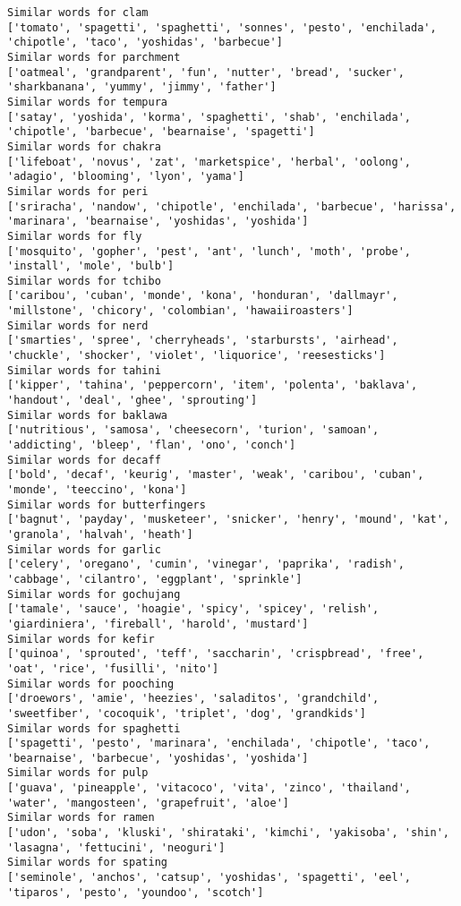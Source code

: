 \documentclass[11pt]{article}
\begin{document}
\begin{Verbatim}[commandchars=\\\{\}]
Similar words for clam
['tomato', 'spagetti', 'spaghetti', 'sonnes', 'pesto', 'enchilada', 'chipotle', 'taco', 'yoshidas', 'barbecue']
Similar words for parchment
['oatmeal', 'grandparent', 'fun', 'nutter', 'bread', 'sucker', 'sharkbanana', 'yummy', 'jimmy', 'father']
Similar words for tempura
['satay', 'yoshida', 'korma', 'spaghetti', 'shab', 'enchilada', 'chipotle', 'barbecue', 'bearnaise', 'spagetti']
Similar words for chakra
['lifeboat', 'novus', 'zat', 'marketspice', 'herbal', 'oolong', 'adagio', 'blooming', 'lyon', 'yama']
Similar words for peri
['sriracha', 'nandow', 'chipotle', 'enchilada', 'barbecue', 'harissa', 'marinara', 'bearnaise', 'yoshidas', 'yoshida']
Similar words for fly
['mosquito', 'gopher', 'pest', 'ant', 'lunch', 'moth', 'probe', 'install', 'mole', 'bulb']
Similar words for tchibo
['caribou', 'cuban', 'monde', 'kona', 'honduran', 'dallmayr', 'millstone', 'chicory', 'colombian', 'hawaiiroasters']
Similar words for nerd
['smarties', 'spree', 'cherryheads', 'starbursts', 'airhead', 'chuckle', 'shocker', 'violet', 'liquorice', 'reesesticks']
Similar words for tahini
['kipper', 'tahina', 'peppercorn', 'item', 'polenta', 'baklava', 'handout', 'deal', 'ghee', 'sprouting']
Similar words for baklawa
['nutritious', 'samosa', 'cheesecorn', 'turion', 'samoan', 'addicting', 'bleep', 'flan', 'ono', 'conch']
Similar words for decaff
['bold', 'decaf', 'keurig', 'master', 'weak', 'caribou', 'cuban', 'monde', 'teeccino', 'kona']
Similar words for butterfingers
['bagnut', 'payday', 'musketeer', 'snicker', 'henry', 'mound', 'kat', 'granola', 'halvah', 'heath']
Similar words for garlic
['celery', 'oregano', 'cumin', 'vinegar', 'paprika', 'radish', 'cabbage', 'cilantro', 'eggplant', 'sprinkle']
Similar words for gochujang
['tamale', 'sauce', 'hoagie', 'spicy', 'spicey', 'relish', 'giardiniera', 'fireball', 'harold', 'mustard']
Similar words for kefir
['quinoa', 'sprouted', 'teff', 'saccharin', 'crispbread', 'free', 'oat', 'rice', 'fusilli', 'nito']
Similar words for pooching
['droewors', 'amie', 'heezies', 'saladitos', 'grandchild', 'sweetfiber', 'cocoquik', 'triplet', 'dog', 'grandkids']
Similar words for spaghetti
['spagetti', 'pesto', 'marinara', 'enchilada', 'chipotle', 'taco', 'bearnaise', 'barbecue', 'yoshidas', 'yoshida']
Similar words for pulp
['guava', 'pineapple', 'vitacoco', 'vita', 'zinco', 'thailand', 'water', 'mangosteen', 'grapefruit', 'aloe']
Similar words for ramen
['udon', 'soba', 'kluski', 'shirataki', 'kimchi', 'yakisoba', 'shin', 'lasagna', 'fettucini', 'neoguri']
Similar words for spating
['seminole', 'anchos', 'catsup', 'yoshidas', 'spagetti', 'eel', 'tiparos', 'pesto', 'youndoo', 'scotch']

\end{Verbatim}
\end{document}
